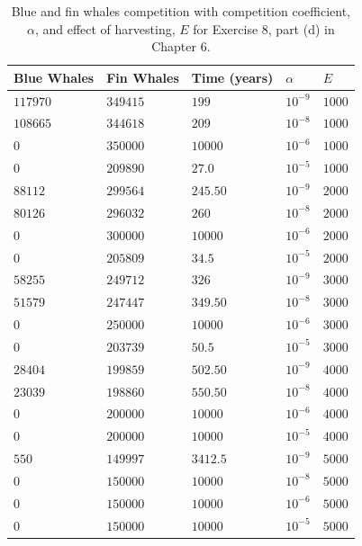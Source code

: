 \documentclass[12pt, oneside]{book}
\begin{document}
\begin{table}[t]
    \centering
    \begin{tabular}{lllll}
        \toprule
        \textbf{Blue Whales} & \textbf{Fin Whales} & \textbf{Time (years)} & \(\alpha\) & \(E\) \\\midrule
        \(117970\) & \(349415\) & \(199\) & \(10^{-9}\) & \(1000\) \\
        \(108665\) & \(344618\) & \(209\) & \(10^{-8}\) & \(1000\) \\
        \(0\) & \(350000\) & \(10000\) & \(10^{-6}\) & \(1000\) \\
        \(0\) & \(209890\) & \(27.0\) & \(10^{-5}\) & \(1000\) \\
        \(88112\) & \(299564\) & \(245.50\) & \(10^{-9}\) & \(2000\) \\
        \(80126\) & \(296032\) & \(260\) & \(10^{-8}\) & \(2000\) \\
        \(0\) & \(300000\) & \(10000\) & \(10^{-6}\) & \(2000\) \\
        \(0\) & \(205809\) & \(34.5\) & \(10^{-5}\) & \(2000\) \\
        \(58255\) & \(249712\) & \(326\) & \(10^{-9}\) & \(3000\) \\
        \(51579\) & \(247447\) & \(349.50\) & \(10^{-8}\) & \(3000\) \\
        \(0\) & \(250000\) & \(10000\) & \(10^{-6}\) & \(3000\) \\
        \(0\) & \(203739\) & \(50.5\) & \(10^{-5}\) & \(3000\) \\
        \(28404\) & \(199859\) & \(502.50\) & \(10^{-9}\) & \(4000\) \\
        \(23039\) & \(198860\) & \(550.50\) & \(10^{-8}\) & \(4000\) \\
        \(0\) & \(200000\) & \(10000\) & \(10^{-6}\) & \(4000\) \\
        \(0\) & \(200000\) & \(10000\) & \(10^{-5}\) & \(4000\) \\
        \(550\) & \(149997\) & \(3412.5\) & \(10^{-9}\) & \(5000\) \\
        \(0\) & \(150000\) & \(10000\) & \(10^{-8}\) & \(5000\) \\
        \(0\) & \(150000\) & \(10000\) & \(10^{-6}\) & \(5000\) \\
        \(0\) & \(150000\) & \(10000\) & \(10^{-5}\) & \(5000\) \\
        \bottomrule
    \end{tabular}
    \caption{Blue and fin whales competition with competition coefficient, \(\alpha\), and effect of harvesting, \(E\) for Exercise 8, part (d) in Chapter 6.}\label{tab:ex8ptd}
\end{table}
\end{document}
